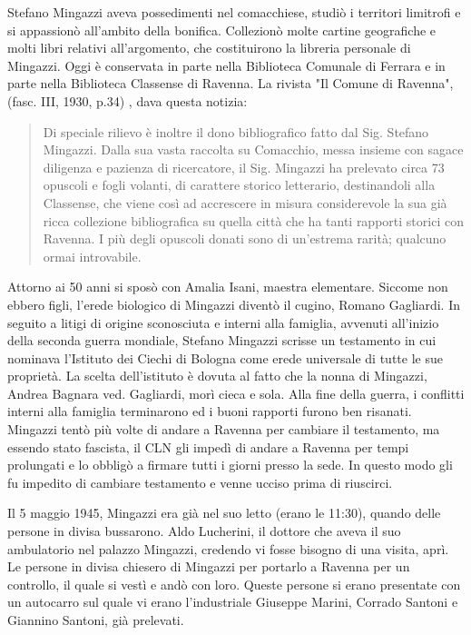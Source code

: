 Stefano Mingazzi aveva possedimenti nel comacchiese, studiò i territori limitrofi e si appassionò all'ambito della bonifica. Collezionò molte cartine geografiche e molti libri relativi all'argomento, che costituirono la libreria personale di Mingazzi. Oggi è conservata in parte nella Biblioteca Comunale di Ferrara e in parte nella Biblioteca Classense di Ravenna. La rivista "Il Comune di Ravenna", (fasc. III, 1930, p.34) , dava questa notizia:
\begin{quotation}
  Di speciale rilievo è inoltre il dono bibliografico fatto dal Sig. Stefano Mingazzi. Dalla sua vasta raccolta su Comacchio, messa insieme con sagace diligenza e pazienza di ricercatore, il Sig. Mingazzi ha prelevato circa 73 opuscoli e fogli volanti, di carattere storico letterario, destinandoli alla Classense, che viene così ad accrescere in misura considerevole la sua già ricca collezione bibliografica su quella città che ha tanti rapporti storici con Ravenna. I più degli opuscoli donati sono di un'estrema rarità; qualcuno ormai introvabile.
\end{quotation}
Attorno ai 50 anni si sposò con Amalia Isani, maestra elementare. Siccome non ebbero figli, l'erede biologico di Mingazzi diventò il cugino, Romano Gagliardi. In seguito a litigi di origine sconosciuta e interni alla famiglia, avvenuti all'inizio della seconda guerra mondiale, Stefano Mingazzi scrisse un testamento in cui nominava l'Istituto dei Ciechi di Bologna come erede universale di tutte le sue proprietà. La scelta dell'istituto è dovuta al fatto che la nonna di Mingazzi, Andrea Bagnara ved. Gagliardi, morì cieca e sola. Alla fine della guerra, i conflitti interni alla famiglia terminarono ed i buoni rapporti furono ben risanati. Mingazzi tentò più volte di andare a Ravenna per cambiare il testamento, ma essendo stato fascista, il CLN gli impedì di andare a Ravenna per tempi prolungati e lo obbligò a firmare tutti i giorni presso la sede. In questo modo gli fu impedito di cambiare testamento e venne ucciso prima di riuscirci.

Il 5 maggio 1945, Mingazzi era già nel suo letto (erano le 11:30), quando delle persone in divisa bussarono. Aldo Lucherini, il dottore che aveva il suo ambulatorio nel palazzo Mingazzi, credendo vi fosse bisogno di una visita, aprì. Le persone in divisa chiesero di Mingazzi per portarlo a Ravenna per un controllo, il quale si vestì e andò con loro. Queste persone si erano presentate con un autocarro sul quale vi erano l'industriale Giuseppe Marini, Corrado Santoni e Giannino Santoni, già prelevati.

